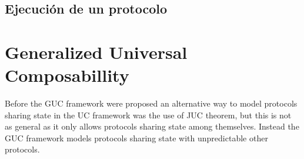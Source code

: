 \subsection{Ejecución de un protocolo}

\section{Generalized Universal Composabillity}

Before the GUC framework were proposed an alternative way
to model protocols sharing state in the UC framework was the use of JUC theorem, but this is not as general as
it only allows protocols sharing state among themselves. Instead the GUC framework models protocols sharing state with
unpredictable other protocols.\\

